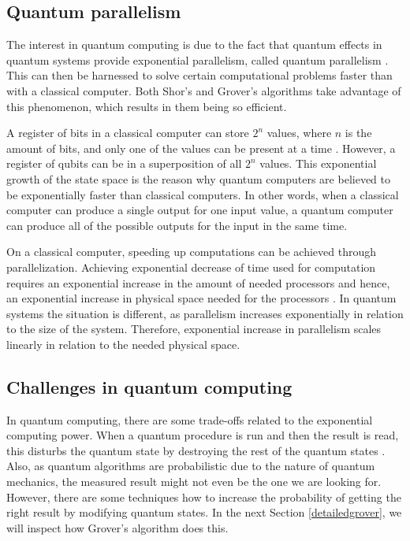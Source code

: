 \documentclass[english,oneside,openright]{UH_DS_report}
\begin{document}
\subsection{Quantum parallelism}
The interest in quantum computing is due to the fact that quantum effects in quantum systems provide exponential parallelism, called quantum parallelism \cite{introtoqc}. This can then be harnessed to solve certain computational problems faster than with a classical computer. Both Shor's and Grover's algorithms take advantage of this phenomenon, which results in them being so efficient.

 A register of bits in a classical computer can store $2^{n}$ values, where $n$ is the amount of bits, and only one of the values can be present at a time \cite{introtoqc}. However, a register of qubits can be in a superposition of all $2^{n}$ values. This exponential growth of the state space is the reason why quantum computers are believed to be exponentially faster than classical computers. In other words, when a classical computer can produce a single output for one input value, a quantum computer can produce all of the possible outputs for the input in the same time.

On a classical computer, speeding up computations can be achieved through parallelization. Achieving exponential decrease of time used for computation requires an exponential increase in the amount of needed processors and hence, an exponential increase in physical space needed for the processors \cite{introtoqc}. In quantum systems the situation is different, as parallelism increases exponentially in relation to the size of the system. Therefore, exponential increase in parallelism scales linearly in relation to the needed physical space.

\subsection{Challenges in quantum computing}
In quantum computing, there are some trade-offs related to the exponential computing power. When a quantum procedure is run and then the result is read, this disturbs the quantum state by destroying the rest of the quantum states \cite{introtoqc}. Also, as quantum algorithms are probabilistic due to the nature of quantum mechanics, the measured result might not even be the one we are looking for. However, there are some techniques how to increase the probability of getting the right result by modifying quantum states. In the next Section \ref{detailedgrover}, we will inspect how Grover's algorithm does this.
\end{document}
